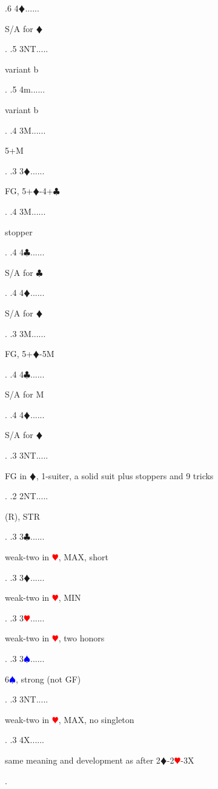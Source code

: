 \documentclass[a4paper]{article}
\newcommand{\BC}{\textcolor{OliveGreen}{$\clubsuit$}}
\newcommand{\BD}{\textcolor{RedOrange}{$\vardiamondsuit$}}
\newcommand{\BH}{\textcolor{Red}{$\varheartsuit${}}}
\newcommand{\BS}{\textcolor{Blue}{$\spadesuit${}}}
\begin{document}
{ .6 4\BD......\begin{minipage}[t]{0.8\textwidth}
S/A for \BD 
\end{minipage}. 
 .5 3NT.....\begin{minipage}[t]{0.8\textwidth}
variant b
\end{minipage}. 
 .5 4m......\begin{minipage}[t]{0.8\textwidth}
variant b
\end{minipage}. 
 .4 3M......\begin{minipage}[t]{0.8\textwidth}
5+M
\end{minipage}. 
 .3 3\BD......\begin{minipage}[t]{0.8\textwidth}
FG, 5+\BD -4+\BC 
\end{minipage}. 
 .4 3M......\begin{minipage}[t]{0.8\textwidth}
stopper
\end{minipage}. 
 .4 4\BC......\begin{minipage}[t]{0.8\textwidth}
S/A for \BC 
\end{minipage}. 
 .4 4\BD......\begin{minipage}[t]{0.8\textwidth}
S/A for \BD 
\end{minipage}. 
 .3 3M......\begin{minipage}[t]{0.8\textwidth}
FG, 5+\BD -5M
\end{minipage}. 
 .4 4\BC......\begin{minipage}[t]{0.8\textwidth}
S/A for M
\end{minipage}. 
 .4 4\BD......\begin{minipage}[t]{0.8\textwidth}
S/A for \BD 
\end{minipage}. 
 .3 3NT.....\begin{minipage}[t]{0.8\textwidth}
FG in \BD , 1-suiter, a solid suit plus stoppers and 9 tricks
\end{minipage}. 
 .2 2NT.....\begin{minipage}[t]{0.8\textwidth}
(R), STR
\end{minipage}. 
 .3 3\BC......\begin{minipage}[t]{0.8\textwidth}
weak-two in \BH , MAX, short
\end{minipage}. 
 .3 3\BD......\begin{minipage}[t]{0.8\textwidth}
weak-two in \BH , MIN
\end{minipage}. 
 .3 3\BH......\begin{minipage}[t]{0.8\textwidth}
weak-two in \BH , two honors
\end{minipage}. 
 .3 3\BS......\begin{minipage}[t]{0.8\textwidth}
6\BS , strong (not GF)
\end{minipage}. 
 .3 3NT.....\begin{minipage}[t]{0.8\textwidth}
weak-two in \BH , MAX, no singleton
\end{minipage}. 
 .3 4X......\begin{minipage}[t]{0.8\textwidth}
same meaning and development as after 2\BD -2\BH -3X
\end{minipage}. 
}
\bigbreak
\end{document}
